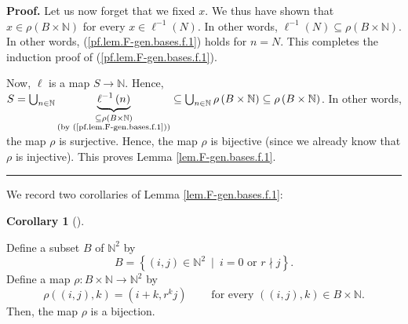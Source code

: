 \documentclass[numbers=enddot,12pt,final,onecolumn,notitlepage]{scrartcl}%
\theoremstyle{definition}
\newtheorem{coro}[theo]{Corollary}
\newenvironment{corollary}[1][]
{\begin{coro}[#1]\begin{leftbar}}
{\end{leftbar}\end{coro}}
\newenvironment{proof}[1][Proof]{\noindent\textbf{#1.} }{\ \rule{0.5em}{0.5em}}
\begin{document}
\begin{proof}
Let us now forget that we fixed $x$. We thus have shown that $x\in\rho\left(
B\times\mathbb{N}\right)  $ for every $x\in\ell^{-1}\left(  N\right)  $. In
other words, $\ell^{-1}\left(  N\right)  \subseteq\rho\left(  B\times
\mathbb{N}\right)  $. In other words, (\ref{pf.lem.F-gen.bases.f.1}) holds for
$n=N$. This completes the induction proof of (\ref{pf.lem.F-gen.bases.f.1}).

Now, $\ell$ is a map $S\rightarrow\mathbb{N}$. Hence, $S=\bigcup
_{n\in\mathbb{N}}\underbrace{\ell^{-1}\left(  n\right)  }_{\substack{\subseteq
\rho\left(  B\times\mathbb{N}\right)  \\\text{(by
(\ref{pf.lem.F-gen.bases.f.1}))}}}\subseteq\bigcup_{n\in\mathbb{N}}\rho\left(
B\times\mathbb{N}\right)  \subseteq\rho\left(  B\times\mathbb{N}\right)  $. In
other words, the map $\rho$ is surjective. Hence, the map $\rho$ is bijective
(since we already know that $\rho$ is injective). This proves Lemma
\ref{lem.F-gen.bases.f.1}.
\end{proof}

We record two corollaries of Lemma \ref{lem.F-gen.bases.f.1}:

\begin{corollary}
\label{cor.F-gen.bases.f.1.cor1}Define a subset $B$ of $\mathbb{N}^{2}$ by%
\begin{equation}
B=\left\{  \left(  i,j\right)  \in\mathbb{N}^{2}\ \mid\ i=0\text{ or }r\nmid
j\right\}  . \label{eq.cor.F-gen.bases.f.1.cor1.def-B}%
\end{equation}
Define a map $\rho:B\times\mathbb{N}\rightarrow\mathbb{N}^{2}$ by%
\begin{equation}
\rho\left(  \left(  i,j\right)  ,k\right)  =\left(  i+k,r^{k}j\right)
\ \ \ \ \ \ \ \ \ \ \text{for every }\left(  \left(  i,j\right)  ,k\right)
\in B\times\mathbb{N}. \label{eq.cor.F-gen.bases.f.1.cor1.def-rho}%
\end{equation}
Then, the map $\rho$ is a bijection.
\end{corollary}
\end{document}

